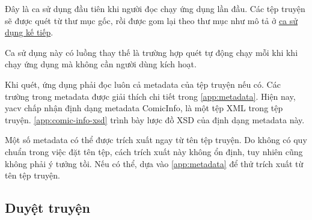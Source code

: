 \documentclass[../../thesis]{subfiles}
\begin{document}
Đây là ca sử dụng đầu tiên khi người đọc chạy ứng dụng lần đầu. Các tệp truyện
sẽ được quét từ thư mục gốc, rồi được gom lại theo thư mục như mô tả ở
\hyperref[sec:browsing]{ca sử dụng kế tiếp}.

Ca sử dụng này có luồng thay thế là trường hợp quét tự động chạy mỗi khi khi
chạy ứng dụng mà không cần người dùng kích hoạt.

Khi quét, ứng dụng phải đọc luôn cả metadata của tệp truyện nếu có. Các trường
trong metadata được giải thích chi tiết trong \autoref{app:metadata}. Hiện nay,
yacv chấp nhận định dạng metadata ComicInfo, là một tệp XML trong tệp truyện.
\autoref{app:comic-info-xsd} trình bày lược đồ XSD của định dạng metadata này.

Một số metadata có thể được trích xuất ngay từ tên tệp truyện. Do không có quy
chuẩn trong việc đặt tên tệp, cách trích xuất này không ổn định, tuy nhiên cũng
không phải ý tưởng tồi. Nếu có thể, dựa vào \autoref{app:metadata} để thử trích
xuất từ tên tệp truyện.

\subsection{Duyệt truyện}\label{sec:browsing}
\end{document}
